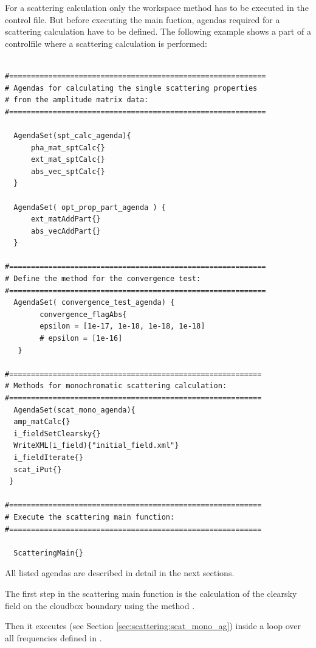 \label{sec:scattering:main_function}
For a scattering calculation only the workspace method  has to be executed in the control file. 
But before executing the main fuction, agendas required for a scattering calculation have to be defined. 
The following example shows a part of a controlfile where a scattering calculation is performed:
\begin{verbatim}

#===========================================================
# Agendas for calculating the single scattering properties
# from the amplitude matrix data:
#===========================================================

  AgendaSet(spt_calc_agenda){
      pha_mat_sptCalc{}
      ext_mat_sptCalc{}
      abs_vec_sptCalc{}
  }

  AgendaSet( opt_prop_part_agenda ) {
      ext_matAddPart{}
      abs_vecAddPart{}
  }
 
#===========================================================
# Define the method for the convergence test:
#===========================================================
  AgendaSet( convergence_test_agenda) {
        convergence_flagAbs{
        epsilon = [1e-17, 1e-18, 1e-18, 1e-18] 
        # epsilon = [1e-16]
   }
  
#==========================================================
# Methods for monochromatic scattering calculation:
#==========================================================
  AgendaSet(scat_mono_agenda){
  amp_matCalc{}
  i_fieldSetClearsky{}
  WriteXML(i_field){"initial_field.xml"}        
  i_fieldIterate{}
  scat_iPut{}
 }
                
#==========================================================
# Execute the scattering main function:
#==========================================================       
        
  ScatteringMain{}

\end{verbatim}

All listed agendas are described in detail in the next sections.\\
\vspace*{1ex}

The first step in the scattering main function is the calculation of the clearsky field on the cloudbox boundary using the method . 

Then it  executes  
(see Section \ref{sec:scattering:scat_mono_ag})
 inside a loop over all frequencies defined in .

